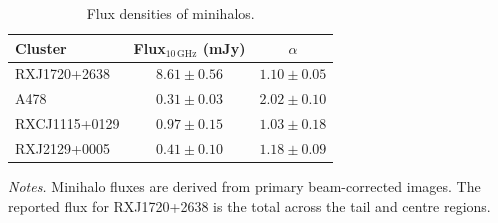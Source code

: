 \begin{table}[h]
    \centering
    \begin{threeparttable}
        \caption{Flux densities of minihalos.}
        \label{tab:mh_flux_densities}

        \begin{tabular}{lcc}
            \toprule
            Cluster & Flux$_{10\,\mathrm{GHz}}$ (mJy) & $\alpha$ \\
            \midrule
            RXJ1720+2638  & $8.61 \pm 0.56$ & $1.10 \pm 0.05$ \\
            A478          & $0.31 \pm 0.03$ & $2.02 \pm 0.10$ \\
            RXCJ1115+0129 & $0.97 \pm 0.15$ & $1.03 \pm 0.18$ \\
            RXJ2129+0005  & $0.41 \pm 0.10$ & $1.18 \pm 0.09$ \\
            \bottomrule
        \end{tabular}

        \begin{tablenotes}[flushleft]
            \footnotesize
            \item \textit{Notes.} Minihalo fluxes are derived from primary beam-corrected images. The reported flux for RXJ1720+2638 is the total across the tail and centre regions.
        \end{tablenotes}

    \end{threeparttable}
\end{table}
